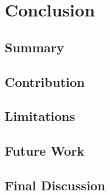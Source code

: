 \documentclass[a4paper,10pt,final]{ThesisStyle}
\begin{document}
\chapter{Conclusion}
\label{ch:conclusion}
\minitoc

\section{Summary}
\section{Contribution}
\section{Limitations}
\section{Future Work}
\section{Final Discussion}








\appendix



\end{document}
